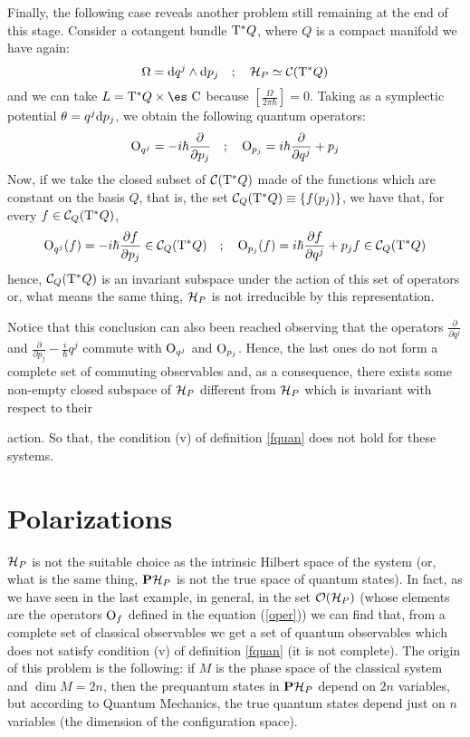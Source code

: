 \documentclass[12pt]{article}
\def\dst{\(}
\def\derpar#1#2{\frac{\partial{#1}}{\partial{#2}}}
\def\d{{\rm d}}
\def\C{{\cal C}}
\def\H{{\cal H}}
\def\Op{{\rm O}}
\def\Complex{\mbox{\es C}}
\def\Tan{{\rm T}}
\begin{document}
Finally, the following case reveals another problem
still remaining at the end of this stage.
Consider a cotangent bundle $\Tan^*Q$,
where $Q$ is a compact manifold we have again:
$$
\Omega = \d q^j \wedge \d p_j
\quad ; \quad
\H_P \simeq \C (\Tan^*Q)
$$
and we can take $L = \Tan^*Q \times \Complex$
because $[\frac{\Omega}{2\pi\hbar}] = 0$. Taking as a symplectic
potential
$\theta = q^j \d p_j$, we obtain the following quantum operators:
$$
\Op_{q^j} = -i\hbar \derpar{}{p_j}
\quad ; \quad
\Op_{p_j} = i\hbar \derpar{}{q^j} + p_j
$$
Now, if we take the closed subset of $\C (\Tan^*Q)$
made of the functions which are constant on the basis $Q$,
that is, the set $\C_Q(\Tan^*Q) \equiv \{ f(p_j) \}$,
we have that, for every $f \in \C_Q(\Tan^*Q)$,
$$
\Op_{q^j}(f) = -i\hbar \derpar{f}{p_j} \in \C_Q(\Tan^*Q)
\quad ; \quad
\Op_{p_j}(f) = i\hbar \derpar{f}{q^j} + p_jf  \in \C_Q(\Tan^*Q)
$$
hence, $\C_Q(\Tan^*Q)$
is an invariant subspace under the action
of this set of operators or, what means the same thing,
$\H_P$ is not irreducible by this representation.

Notice that this conclusion can also been reached
observing that the operators
\dst\derpar{}{q^j}\) and \dst\derpar{}{p_j}-\frac{i}{\hbar}q^j\)
commute with $\Op_{q^j}$ and $\Op_{p_j}$.
Hence, the last ones do not form a
complete set of commuting observables and,
as a consequence, there exists some non-empty closed subspace
of $\H_P$ different from $\H_P$ which is invariant with respect to their

action.
So that, the condition (v) of definition \ref{fquan} does not hold for
these systems.



\section{Polarizations}
\protect \label{gqpol}


$\H_P$ is not the suitable choice as the intrinsic Hilbert space
of the system (or, what is the same thing, ${\bf P}\H_P$ is not
the true space of quantum states). In fact, as we have seen in the
last example, in general, in the set ${\cal O}(\H_P)$ (whose
elements are the operators $\Op_f$ defined in the equation
(\ref{oper})) we can find that, from a complete set of classical
observables we get a set of quantum observables which does not
satisfy condition (v) of definition \ref{fquan} (it is not
complete). The origin of this problem is the following: if $M$ is
the phase space of the classical system and $\dim M =2n$, then the
prequantum states in ${\bf P}\H_P$ depend on $2n$ variables, but
according to Quantum Mechanics, the true quantum states depend
just on $n$ variables (the dimension of the configuration space).
\end{document}
